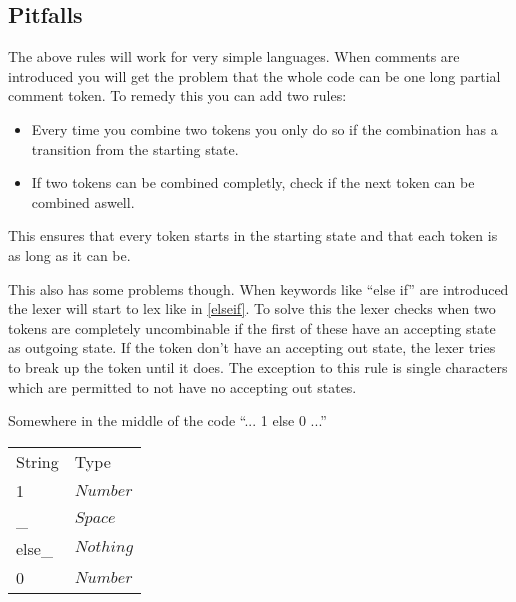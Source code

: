 \subsection{Pitfalls}
The above rules will work for very simple languages. When comments are
introduced you will get the problem that the whole code can be one long partial
comment token. To remedy this you can add two rules:
\begin{itemize}
\item Every time you combine two tokens you only do so if the combination has a
transition from the starting state.
\item If two tokens can be combined completly, check if the next token can be
combined aswell.
\end{itemize}
This ensures that every token starts in the starting state and that each token
is as long as it can be.

This also has some problems though. When keywords like ``else if'' are
introduced the lexer will start to lex like in \cref{elseif}. To solve this the
lexer checks when two tokens are completely uncombinable if the first of these
have an accepting state as outgoing state. If the token don't have an accepting
out state, the lexer tries to break up the token until it does. The exception to
this rule is single characters which are permitted to not have no accepting out
states.
\begin{example}\label{elseif}
Somewhere in the middle of the code ``... 1 else 0 ...''
\begin{center}
\begin{tabular}{ll}
String & Type\\
1 & $Number$\\
\_ & $Space$\\
else\_ & $Nothing$\\
0 & $Number$\\
\end{tabular}
\end{center}
\end{example}
